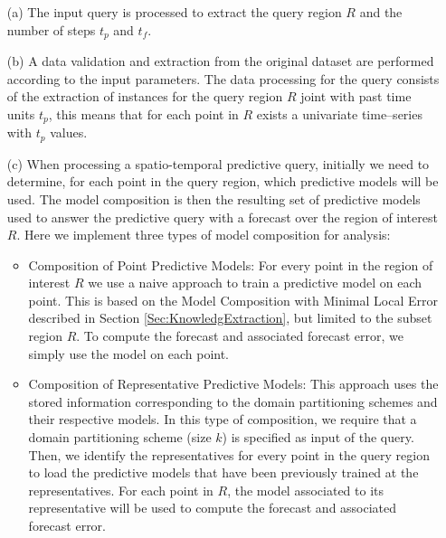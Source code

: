 \begin{itemize}
    \item [(a)] The input query is processed to extract the query region $R$ and the number of steps $t_p$ and $t_f$.
    \item [(b)] A data validation and extraction from the original dataset are performed according to the input parameters. The data processing for the query consists of the extraction of instances for the query region $R$ joint with past time units $t_{p}$, this means that for each point in $R$ exists a univariate time--series with $t_{p}$ values.
    \item [(c)] When processing a spatio-temporal predictive query, initially we need to determine, for each point in the query region, which predictive models will be used. The model composition is then the resulting set of predictive models used to answer the predictive query with a forecast over the region of interest $R$. %
    Here we implement three types of model composition for analysis:

   \begin{itemize}

	\item Composition of Point Predictive Models: For every point in the region of interest $R$ we use a naive approach to train a predictive model on each point. This is based on the Model Composition with Minimal Local Error described in Section \ref{Sec:KnowledgExtraction}, but limited to the subset region $R$. To compute the forecast and associated forecast error, we simply use the model on each point.

	\item Composition of Representative Predictive Models: This approach uses the stored information corresponding to the domain partitioning schemes and their respective models. In this type of composition, we require that a domain partitioning scheme (size $k$) is specified as input of the query. Then, we identify the representatives for every point in the query region to load the predictive models that have been previously trained at the representatives. For each point in $R$, the model associated to its representative will be used to compute the forecast and associated forecast error.
	

\end{itemize}
\end{itemize}
